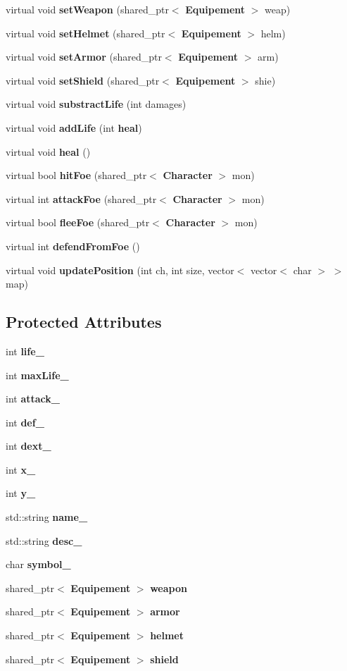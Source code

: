 \begin{DoxyCompactItemize}
virtual void {\bf set\-Weapon} (shared\-\_\-ptr$<$ {\bf Equipement} $>$ weap)
\item 
virtual void {\bf set\-Helmet} (shared\-\_\-ptr$<$ {\bf Equipement} $>$ helm)
\item 
virtual void {\bf set\-Armor} (shared\-\_\-ptr$<$ {\bf Equipement} $>$ arm)
\item 
virtual void {\bf set\-Shield} (shared\-\_\-ptr$<$ {\bf Equipement} $>$ shie)
\item 
virtual void {\bf substract\-Life} (int damages)
\item 
virtual void {\bf add\-Life} (int {\bf heal})
\item 
virtual void {\bf heal} ()
\item 
virtual bool {\bf hit\-Foe} (shared\-\_\-ptr$<$ {\bf Character} $>$ mon)
\item 
virtual int {\bf attack\-Foe} (shared\-\_\-ptr$<$ {\bf Character} $>$ mon)
\item 
virtual bool {\bf flee\-Foe} (shared\-\_\-ptr$<$ {\bf Character} $>$ mon)
\item 
virtual int {\bf defend\-From\-Foe} ()
\item 
virtual void {\bf update\-Position} (int ch, int size, vector$<$ vector$<$ char $>$ $>$ map)
\end{DoxyCompactItemize}
\subsection*{Protected Attributes}
\begin{DoxyCompactItemize}
\item 
int {\bf life\-\_\-}
\item 
int {\bf max\-Life\-\_\-}
\item 
int {\bf attack\-\_\-}
\item 
int {\bf def\-\_\-}
\item 
int {\bf dext\-\_\-}
\item 
int {\bf x\-\_\-}
\item 
int {\bf y\-\_\-}
\item 
std\-::string {\bf name\-\_\-}
\item 
std\-::string {\bf desc\-\_\-}
\item 
char {\bf symbol\-\_\-}
\item 
shared\-\_\-ptr$<$ {\bf Equipement} $>$ {\bf weapon}
\item 
shared\-\_\-ptr$<$ {\bf Equipement} $>$ {\bf armor}
\item 
shared\-\_\-ptr$<$ {\bf Equipement} $>$ {\bf helmet}
\item 
shared\-\_\-ptr$<$ {\bf Equipement} $>$ {\bf shield}
\end{DoxyCompactItemize}


